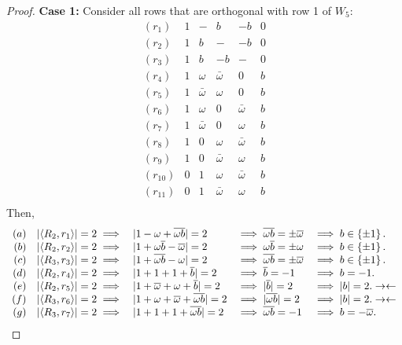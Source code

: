 \begin{lemma}
\begin{proof}
{\bf Case 1:} Consider all rows that are orthogonal with row 1 of $W_5$:
 $$
 \begin{array}{rccccc}
   (r_{1})  & 1 & -       & b       & -b      & 0 \\
   (r_{2})  & 1 & b       & -       & -b      & 0 \\
   (r_{3})  & 1 & b       & -b      & -       & 0 \\
   (r_{4})  & 1 & \omega       & \bar{\omega} & 0       & b \\
   (r_{5})  & 1 & \bar{\omega} & \omega       & 0       & b \\
   (r_{6})  & 1 & \omega       & 0       & \bar{\omega} & b \\
   (r_{7})  & 1 & \bar{\omega} & 0       &\omega       & b \\
   (r_{8})  & 1 & 0       & \omega       & \bar{\omega} & b \\
   (r_{9})  & 1 & 0       & \bar{\omega} & \omega       & b \\
   (r_{10}) & 0 & 1       & \omega       & \bar{\omega} & b \\
   (r_{11}) & 0 & 1       & \bar{\omega} & \omega       & b \\
 \end{array}
 $$
Then,
    $$
     \begin{array}{rcllll}
      (a) & \unb21 \implies & |1-\omega+\overline{\omega b}|=2 &\implies \bar{\omega b} = \pm\bar{\omega}  &\implies b \in \left\{ \pm1 \right\}.   \\
      (b) & \unb22 \implies & |1+\omega\bar{b}-\bar{\omega}|=2        &\implies \omega\bar{b} = \pm\omega       &\implies b \in \left\{ \pm1\right\}.        \\
      (c) & \unb33 \implies & |1+\overline{\omega b}-\omega|=2         &\implies \bar{\omega b} = \pm\bar{\omega}  &\implies b \in \left\{ \pm1\right\}.        \\
      (d) & \unb24 \implies & |1+1+1+\overline{b}|=2        &\implies \overline{b} = -1      &\implies b = -1.          \\
      (e) & \unb25 \implies & |1+\bar{\omega}+\omega+\bar{b}|=2       &\implies |\bar{b}| = 2          &\implies |b|=2.     \con \\
      (f) & \unb36 \implies & |1+\omega+\bar{\omega}+\overline{\omega b}|=2 &\implies |\overline{\omega b}|=2      &\implies |b|=2.     \con \\
      (g) & \unb37 \implies & |1+1+1+\overline{\omega b}|=2       &\implies \overline{\omega b} = -1     &\implies b = -\bar{\omega}.    \\

\end{array}$$
\end{proof}
\end{lemma}
